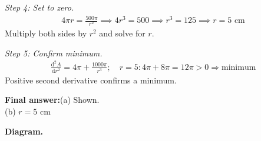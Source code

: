 \documentclass[11pt]{article}
\begin{document}
\textit{Step 4: Set to zero.}
\[\begin{gathered}
4\pi r = \frac{500\pi}{r^2} \implies 4r^3 = 500 \implies r^3 = 125 \implies r = 5 \text{ cm}
\end{gathered}\]
Multiply both sides by \( r^2 \) and solve for \( r \).

\textit{Step 5: Confirm minimum.}
\[\begin{gathered}
\frac{\mathrm{d}^2A}{\mathrm{d}r^2} = 4\pi + \frac{1000\pi}{r^3}; \quad r=5: 4\pi + 8\pi = 12\pi > 0 \Rightarrow \text{minimum}
\end{gathered}\]
Positive second derivative confirms a minimum.

\begin{answerbox}
\textbf{Final answer:}\quad (a) Shown. \\[3pt]  (b) \(\displaystyle  r = 5 \) cm
\end{answerbox}
\textbf{Diagram.}
\end{document}

